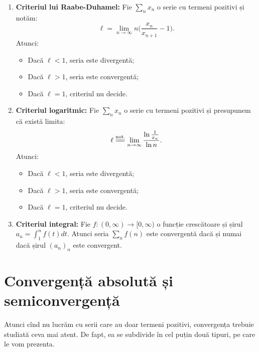 \documentclass[11pt,a4paper]{article}
\theoremstyle{dotless}
\theoremstyle{dotlessdr}
\begin{document}
\begin{enumerate}[(1)]
\begin{itemize}
      \item Dacă $\ell < 1$, seria este convergentă;
      \item Dacă $\ell > 1$, seria este divergentă;
      \item Dacă $\ell = 1$, criteriul nu decide.
    \end{itemize}
  \item \textbf{Criteriul lui Raabe-Duhamel:} Fie $\sum_n x_n$ o serie cu termeni
    pozitivi și notăm:
    \[
      \ell = \lim_{n \to \infty} n \Big( \frac{x_n}{x_{n+1}} - 1 \Big).
    \]
    Atunci:
    \begin{itemize}
      \item Dacă $\ell < 1$, seria este divergentă;
      \item Dacă $\ell > 1$, seria este convergentă;
      \item Dacă $\ell = 1$, criteriul nu decide.
    \end{itemize}
  \item \textbf{Criteriul logaritmic:} Fie $\sum_n x_n$ o serie cu termeni pozitivi
    și presupunem că există limita:
    \[
      \ell \stackrel{\text{not.}}{=\joinrel=} \lim_{n \to \infty} %
    \frac{\ln \frac{1}{x_n}}{\ln n}.
    \]
    Atunci:
    \begin{itemize}
      \item Dacă $\ell < 1$, seria este divergentă;
      \item Dacă $\ell > 1$, seria este convergentă;
      \item Dacă $\ell = 1$, criteriul nu decide.
    \end{itemize}
  \item \textbf{Criteriul integral:} Fie $f: (0, \infty) \to [0, \infty)$ o funcție
    crescătoare și șirul $a_n = \int_1^n f(t) dt$. Atunci seria $\sum_n f(n)$ este
    convergentă dacă și numai dacă șirul $(a_n)_n$ este convergent.
\end{enumerate}


\section{Convergență absolută și semiconvergență}

Atunci cînd nu lucrăm cu serii care au doar termeni pozitivi, convergența trebuie
studiată ceva mai atent. De fapt, ea se subdivide în cel puțin două tipuri, pe
care le vom prezenta.
\end{document}
